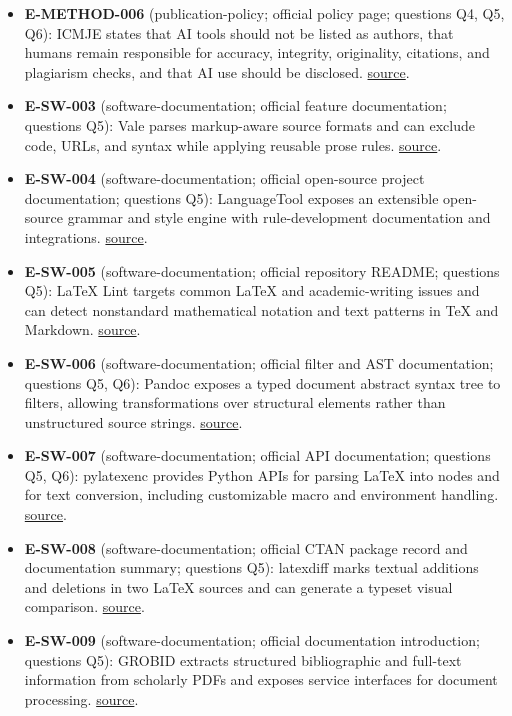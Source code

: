 \documentclass[11pt]{article}
\begin{document}
\begin{itemize}
\item
  \textbf{E-METHOD-006} (publication-policy; official policy page; questions Q4, Q5, Q6): ICMJE states that AI tools should not be listed as authors, that humans remain responsible for accuracy, integrity, originality, citations, and plagiarism checks, and that AI use should be disclosed. \href{https://www.icmje.org/recommendations/browse/artificial-intelligence/ai-use-by-authors.html}{source}.
\item
  \textbf{E-SW-003} (software-documentation; official feature documentation; questions Q5): Vale parses markup-aware source formats and can exclude code, URLs, and syntax while applying reusable prose rules. \href{https://vale.sh/features/markup}{source}.
\item
  \textbf{E-SW-004} (software-documentation; official open-source project documentation; questions Q5): LanguageTool exposes an extensible open-source grammar and style engine with rule-development documentation and integrations. \href{https://languagetool.org/dev}{source}.
\item
  \textbf{E-SW-005} (software-documentation; official repository README; questions Q5): LaTeX Lint targets common LaTeX and academic-writing issues and can detect nonstandard mathematical notation and text patterns in TeX and Markdown. \href{https://github.com/HirokiHamaguchi/latexlint}{source}.
\item
  \textbf{E-SW-006} (software-documentation; official filter and AST documentation; questions Q5, Q6): Pandoc exposes a typed document abstract syntax tree to filters, allowing transformations over structural elements rather than unstructured source strings. \href{https://pandoc.org/filters.html}{source}.
\item
  \textbf{E-SW-007} (software-documentation; official API documentation; questions Q5, Q6): pylatexenc provides Python APIs for parsing LaTeX into nodes and for text conversion, including customizable macro and environment handling. \href{https://pylatexenc.readthedocs.io/en/latest/}{source}.
\item
  \textbf{E-SW-008} (software-documentation; official CTAN package record and documentation summary; questions Q5): latexdiff marks textual additions and deletions in two LaTeX sources and can generate a typeset visual comparison. \href{https://www.ctan.org/pkg/latexdiff}{source}.
\item
  \textbf{E-SW-009} (software-documentation; official documentation introduction; questions Q5): GROBID extracts structured bibliographic and full-text information from scholarly PDFs and exposes service interfaces for document processing. \href{https://grobid.readthedocs.io/en/latest/Introduction/}{source}.

\end{itemize}
\end{document}
